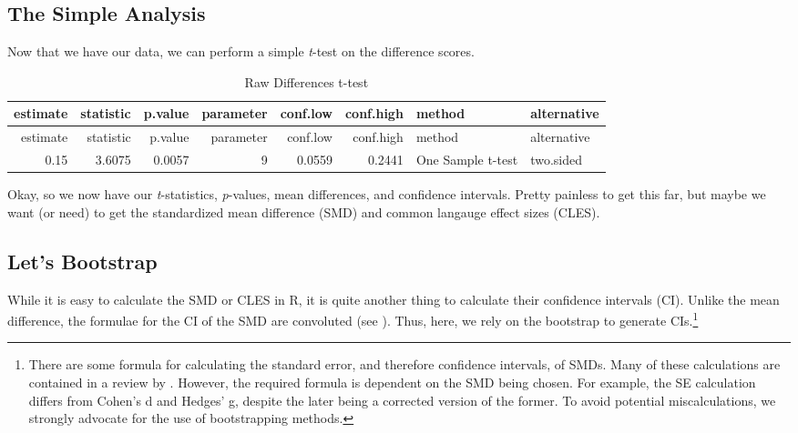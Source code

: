 \documentclass[]{tufte-handout}
\newenvironment{Shaded}{}{}
\newcommand{\DataTypeTok}[1]{\textcolor[rgb]{0.56,0.13,0.00}{#1}}
\newcommand{\DecValTok}[1]{\textcolor[rgb]{0.25,0.63,0.44}{#1}}
\newcommand{\KeywordTok}[1]{\textcolor[rgb]{0.00,0.44,0.13}{\textbf{#1}}}
\newcommand{\NormalTok}[1]{#1}
\newcommand{\OperatorTok}[1]{\textcolor[rgb]{0.40,0.40,0.40}{#1}}
\newcommand{\StringTok}[1]{\textcolor[rgb]{0.25,0.44,0.63}{#1}}
\begin{document}
\hypertarget{the-simple-analysis}{%
\subsection{The Simple Analysis}\label{the-simple-analysis}}

Now that we have our data, we can perform a simple \emph{t}-test on the
difference scores.

\begin{Shaded}
\end{Shaded}

\begin{longtable}[]{@{}rrrrrrll@{}}
\caption{Raw Differences t-test}\tabularnewline
\toprule
estimate & statistic & p.value & parameter & conf.low & conf.high &
method & alternative\tabularnewline
\midrule
\endfirsthead
\toprule
estimate & statistic & p.value & parameter & conf.low & conf.high &
method & alternative\tabularnewline
\midrule
\endhead
0.15 & 3.6075 & 0.0057 & 9 & 0.0559 & 0.2441 & One Sample t-test &
two.sided\tabularnewline
\bottomrule
\end{longtable}

Okay, so we now have our \emph{t}-statistics, \emph{p}-values, mean
differences, and confidence intervals. Pretty painless to get this far,
but maybe we want (or need) to get the standardized mean difference
(SMD) and common langauge effect sizes (CLES).

\hypertarget{lets-bootstrap}{%
\subsection{Let's Bootstrap}\label{lets-bootstrap}}

While it is easy to calculate the SMD or CLES in R, it is quite another
thing to calculate their confidence intervals (CI). Unlike the mean
difference, the formulae for the CI of the SMD are convoluted (see
\citet{hedges1981}). Thus, here, we rely on the bootstrap to generate
CIs.\footnote{There are some formula for calculating the standard error,
  and therefore confidence intervals, of SMDs. Many of these
  calculations are contained in a review by
  \citet{Nakagawa_Cuthill_2007}. However, the required formula is
  dependent on the SMD being chosen. For example, the SE calculation
  differs from Cohen's d and Hedges' g, despite the later being a
  corrected version of the former. To avoid potential miscalculations,
  we strongly advocate for the use of bootstrapping methods.}
\end{document}
